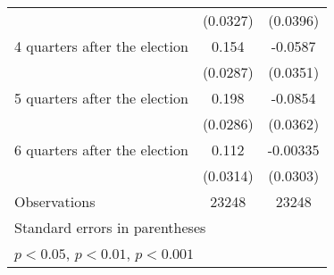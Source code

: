 \begin{table}[htbp]
\begin{tabular}{l*{2}{c}}
                    &    (0.0327)         &    (0.0396)         \\
[1em]
 4 quarters after the election&       0.154\sym{***}&     -0.0587         \\
                    &    (0.0287)         &    (0.0351)         \\
[1em]
 5 quarters after the election&       0.198\sym{***}&     -0.0854\sym{*}  \\
                    &    (0.0286)         &    (0.0362)         \\
[1em]
 6 quarters after the election&       0.112\sym{***}&    -0.00335         \\
                    &    (0.0314)         &    (0.0303)         \\
\hline
Observations        &       23248         &       23248         \\
\hline\hline
\multicolumn{3}{l}{\footnotesize Standard errors in parentheses}\\
\multicolumn{3}{l}{\footnotesize \sym{*} \(p<0.05\), \sym{**} \(p<0.01\), \sym{***} \(p<0.001\)}\\
\end{tabular}
\end{table}
